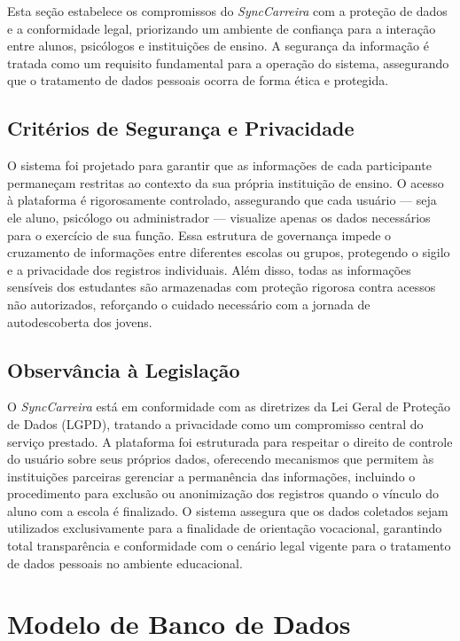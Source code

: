 Esta seção estabelece os compromissos do \textit{SyncCarreira} com a proteção de dados e a conformidade legal, priorizando um ambiente de confiança para a interação entre alunos, psicólogos e instituições de ensino. A segurança da informação é tratada como um requisito fundamental para a operação do sistema, assegurando que o tratamento de dados pessoais ocorra de forma ética e protegida.

\subsection{Critérios de Segurança e Privacidade}

O sistema foi projetado para garantir que as informações de cada participante permaneçam restritas ao contexto da sua própria instituição de ensino. O acesso à plataforma é rigorosamente controlado, assegurando que cada usuário --- seja ele aluno, psicólogo ou administrador --- visualize apenas os dados necessários para o exercício de sua função. Essa estrutura de governança impede o cruzamento de informações entre diferentes escolas ou grupos, protegendo o sigilo e a privacidade dos registros individuais. Além disso, todas as informações sensíveis dos estudantes são armazenadas com proteção rigorosa contra acessos não autorizados, reforçando o cuidado necessário com a jornada de autodescoberta dos jovens.

\subsection{Observância à Legislação}

O \textit{SyncCarreira} está em conformidade com as diretrizes da Lei Geral de Proteção de Dados (LGPD), tratando a privacidade como um compromisso central do serviço prestado. A plataforma foi estruturada para respeitar o direito de controle do usuário sobre seus próprios dados, oferecendo mecanismos que permitem às instituições parceiras gerenciar a permanência das informações, incluindo o procedimento para exclusão ou anonimização dos registros quando o vínculo do aluno com a escola é finalizado. O sistema assegura que os dados coletados sejam utilizados exclusivamente para a finalidade de orientação vocacional, garantindo total transparência e conformidade com o cenário legal vigente para o tratamento de dados pessoais no ambiente educacional.

\section{Modelo de Banco de Dados}

